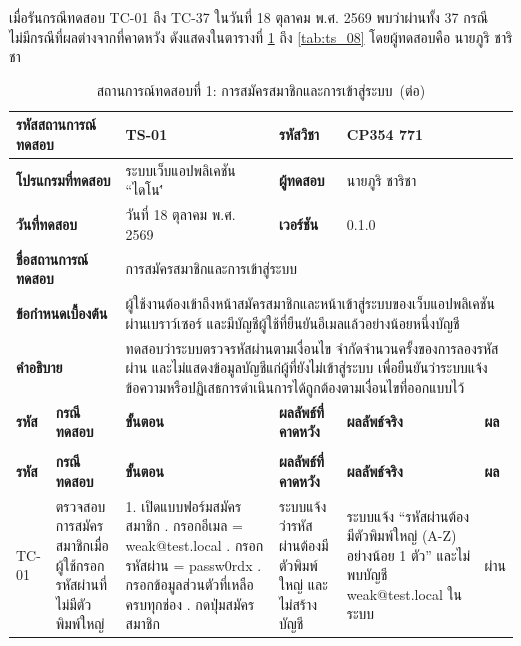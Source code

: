เมื่อรันกรณีทดสอบ TC-01 ถึง TC-37 ในวันที่ 18 ตุลาคม พ.ศ. 2569 พบว่าผ่านทั้ง 37 กรณี ไม่มีกรณีที่ผลต่างจากที่คาดหวัง ดังแสดงในตารางที่ \ref{tab:test_cases} ถึง \ref{tab:ts_08} โดยผู้ทดสอบคือ นายภูริ ชาริชา
\begin{landscape}
{\small\setlength{\tabcolsep}{3pt}
\begin{longtable}{|p{}|p{}|p{}|p{}|p{}|>{\centering\arraybackslash}p{}|}
\caption{สถานการณ์ทดสอบที่ 1: การสมัครสมาชิกและการเข้าสู่ระบบ}\label{tab:test_cases}\\
\hline
\multicolumn{2}{|l|}{\textbf{รหัสสถานการณ์ทดสอบ}} & TS-01 & \textbf{รหัสวิชา} & \multicolumn{2}{l|}{CP354 771} \\ \hline
\multicolumn{2}{|l|}{\textbf{โปรแกรมที่ทดสอบ}} & ระบบเว็บแอปพลิเคชัน ``ไดโน\'\' & \textbf{ผู้ทดสอบ} & \multicolumn{2}{l|}{นายภูริ ชาริชา} \\ \hline
\multicolumn{2}{|l|}{\textbf{วันที่ทดสอบ}} & วันที่ 18 ตุลาคม พ.ศ. 2569 & \textbf{เวอร์ชัน} & \multicolumn{2}{l|}{0.1.0} \\ \hline
\multicolumn{2}{|l|}{\textbf{ชื่อสถานการณ์ทดสอบ}} & \multicolumn{4}{p{\dimexpr0.756\linewidth+18pt\relax}|}{การสมัครสมาชิกและการเข้าสู่ระบบ} \\ \hline
\multicolumn{2}{|l|}{\textbf{ข้อกำหนดเบื้องต้น}} & \multicolumn{4}{p{\dimexpr0.756\linewidth+18pt\relax}|}{ผู้ใช้งานต้องเข้าถึงหน้าสมัครสมาชิกและหน้าเข้าสู่ระบบของเว็บแอปพลิเคชันผ่านเบราว์เซอร์ และมีบัญชีผู้ใช้ที่ยืนยันอีเมลแล้วอย่างน้อยหนึ่งบัญชี} \\ \hline
\multicolumn{2}{|l|}{\textbf{คำอธิบาย}} & \multicolumn{4}{p{\dimexpr0.756\linewidth+18pt\relax}|}{ทดสอบว่าระบบตรวจรหัสผ่านตามเงื่อนไข จำกัดจำนวนครั้งของการลองรหัสผ่าน และไม่แสดงข้อมูลบัญชีแก่ผู้ที่ยังไม่เข้าสู่ระบบ เพื่อยืนยันว่าระบบแจ้งข้อความหรือปฏิเสธการดำเนินการได้ถูกต้องตามเงื่อนไขที่ออกแบบไว้} \\ \hline
\textbf{รหัส} & \textbf{กรณีทดสอบ} & \textbf{ขั้นตอน} & \textbf{ผลลัพธ์ที่คาดหวัง} & \textbf{ผลลัพธ์จริง} & \textbf{ผล} \\ \hline
\endfirsthead
\caption[]{สถานการณ์ทดสอบที่ 1: การสมัครสมาชิกและการเข้าสู่ระบบ~(\textnormal{ต่อ})}\\
\hline
\textbf{รหัส} & \textbf{กรณีทดสอบ} & \textbf{ขั้นตอน} & \textbf{ผลลัพธ์ที่คาดหวัง} & \textbf{ผลลัพธ์จริง} & \textbf{ผล} \\ \hline
\endhead
TC-01 & ตรวจสอบการสมัครสมาชิกเมื่อผู้ใช้กรอกรหัสผ่านที่ไม่มีตัวพิมพ์ใหญ่ & 1. เปิดแบบฟอร์มสมัครสมาชิก \newline 2. กรอกอีเมล = weak@test.local \newline 3. กรอกรหัสผ่าน = passw0rdx \newline 4. กรอกข้อมูลส่วนตัวที่เหลือครบทุกช่อง \newline 5. กดปุ่มสมัครสมาชิก & ระบบแจ้งว่ารหัสผ่านต้องมีตัวพิมพ์ใหญ่ และไม่สร้างบัญชี & ระบบแจ้ง ``รหัสผ่านต้องมีตัวพิมพ์ใหญ่ (A-Z) อย่างน้อย 1 ตัว'' และไม่พบบัญชี weak@test.local ในระบบ & ผ่าน \\ \hline

\end{longtable}}
\end{landscape}
